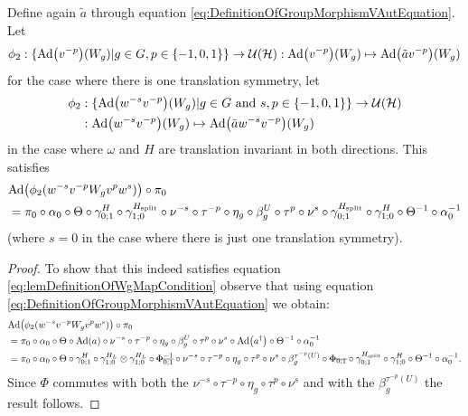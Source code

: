 \documentclass[11pt,a4paper,twoside]{article}
\numberwithin{equation}{section}
\begin{document}
	\begin{lemma}\label{lem:DefinitionOfWgMap}
		Define again $\tilde{a}$ through equation \eqref{eq:DefinitionOfGroupMorphismVAutEquation}. Let
		\begin{equation}
			\phi_2:\{\Ad{v^{-p}}(W_g)|g\in G,p\in\{-1,0,1\}\}\rightarrow \UU(\HH):\Ad{v^{-p}} (W_g)\mapsto \Ad{\tilde{a}v^{-p}} (W_g)
		\end{equation}
		for the case where there is one translation symmetry, let
		\begin{align}
			\phi_2&:\{\Ad{w^{-s}v^{-p}}(W_g)|g\in G\text{ and }s,p\in\{-1,0,1\}\}\rightarrow \UU(\HH)\\
			\nonumber
			&:\Ad{w^{-s}v^{-p}} (W_g)\mapsto \Ad{\tilde{a}w^{-s}v^{-p}} (W_g)
		\end{align}
		in the case where $\omega$ and $H$ are translation invariant in both directions. This satisfies
		\begin{align}\label{eq:lemDefinitionOfWgMapCondition}
			&\Ad{\phi_2(w^{-s}v^{-p}W_g v^{p}w^{s})}\circ\pi_0\\
			\nonumber
			&=\pi_0\circ \alpha_0\circ\Theta\circ\gamma^{H}_{0;1}\circ\gamma^{\Hsplit}_{1;0}\circ\nu^{-s}\circ\tau^{-p}\circ\eta_g\circ\beta_g^U\circ\tau^p\circ\nu^{s}\circ\gamma^{\Hsplit}_{0;1}\circ\gamma^{H}_{1;0}\circ\Theta^{-1}\circ\alpha_0^{-1}
		\end{align}
		(where $s=0$ in the case where there is just one translation symmetry).
	\end{lemma}
	\begin{proof}
		To show that this indeed satisfies equation \eqref{eq:lemDefinitionOfWgMapCondition} observe that using equation \eqref{eq:DefinitionOfGroupMorphismVAutEquation} we obtain:
		\begin{align}
			&\Ad{\phi_2(w^{-s}v^{-p}W_g v^{p}w^{s})}\circ\pi_0\\
			&=\pi_0\circ \alpha_0\circ\Theta\circ\Ad{a}\circ\nu^{-s}\circ\tau^{-p}\circ\eta_g\circ\beta_g^U\circ\tau^p\circ\nu^{s}\circ\Ad{a^{\dagger}}\circ\Theta^{-1}\circ\alpha_0^{-1}\\
			&=\pi_0\circ \alpha_0\circ\Theta\circ\gamma^H_{0;1}\circ\gamma^{H_L}_{1;0}\otimes\gamma^{H_L}_{1;0}\circ\stkout{\Phi_{0;1}^{-1}}\circ\nu^{-s}\circ\tau^{-p}\circ\eta_g\circ\tau^p\circ\nu^{s}\circ\beta_g^{\tau^{-p}(U)}\circ\stkout{\Phi_{0;1}}\circ\gamma^{\Hsplit}_{0;1}\circ\gamma^H_{1;0}\circ\Theta^{-1}\circ\alpha_0^{-1}.
		\end{align}
		Since $\Phi$ commutes with both the $\nu^{-s}\circ\tau^{-p}\circ\eta_g\circ\tau^p\circ\nu^s$ and with the $\beta_g^{\tau^{-p}(U)}$ the result follows.
	\end{proof}
\end{document}
